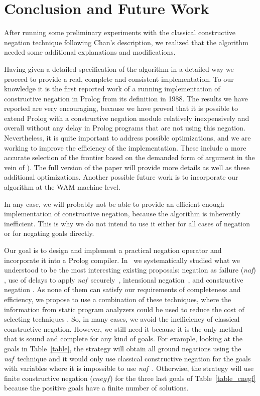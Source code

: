 \documentclass{tlp}
\newcommand{\naf}{{\em naf}}\newcommand{\viejo}[1]{}
\begin{document}
\section{Conclusion and Future Work}
\label{conclusion}
After running some preliminary experiments with the classical constructive 
negation technique  following Chan's description, we realized that the
algorithm needed some additional explanations and modifications.

Having given a detailed specification of the algorithm in a detailed way
we proceed to provide a real, complete and consistent
implementation. To our knowledge it is the first reported work of a running
implementation
of constructive negation in Prolog from its definition in 1988. 
The results we have reported are very encouraging,
because we have proved that it is possible to extend Prolog with a
constructive negation module relatively inexpensively and overall
without any delay in Prolog programs that are not using this
negation. Nevertheless, it is quite important to address possible
optimizations, and we are working to improve the efficiency of the
implementation. These include a more accurate selection of the
frontier based on the demanded form of argument in the vein of
\cite{Moreno2}). The full version of the paper will provide more details
as well as these additional optimizations.
Another possible future work is to incorporate our algorithm
at the WAM machine level.

In any case, we will probably not be able to provide an efficient enough
implementation of constructive negation, because the algorithm is
inherently inefficient.  This is why we do not intend to
use it either for all cases of negation or for negating goals
directly.

Our goal is to design and implement a practical negation operator and
incorporate it into a Prolog compiler.
In~\cite{SusanaPADL2000,SusanaLPAR01} we systematically studied what
we understood to be the most interesting existing proposals: negation
as failure (\naf) \cite{Clark}, use of delays to apply \naf\
securely~\cite{naish:lncs}, intensional
negation~\cite{Barbuti1,Barbuti2}, and constructive negation
\cite{Chan1,Chan2,Drabent,Stuckey,Stuckey95}. As none of them can
satisfy our requirements of completeness and efficiency, we propose to
use a combination of these techniques, where the information from
static program analyzers could be used to reduce the cost of selecting
techniques \cite{SusanaLPAR01}. So, in many cases, we avoid the
inefficiency of classical constructive negation. However, we still
need it because it is the only method that is sound and complete for
any kind of goals. For example, looking at the goals in
Table~\ref{table}, the strategy will obtain all ground negations using
the \naf\ technique and it would only use classical constructive
negation for the goals with variables where it is impossible to use
\naf\ . Otherwise, the strategy will use finite constructive negation
($cnegf$) for the three last goals of Table~\ref{table_cnegf} because
the positive goals have a finite number of solutions.
\end{document}
